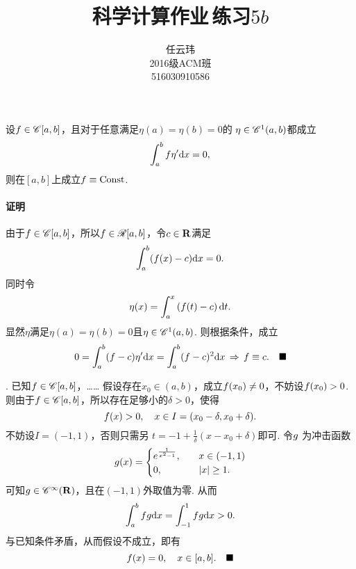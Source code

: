 

\title{科学计算作业$\,$练习$5b$}
\author{\small 任云玮\\\small2016级ACM班\\\small516030910586}
\date{}


\maketitle

\begin{lemma}
  \label{lemma: 变分引理2}
  设$\mathnormal{f}\in\mathscr{C}[a, b]$，且对于任意满足$\eta(a) = \eta(b) = 0$的
  $\eta\in\mathscr{C}^1(a, b)$都成立
  \[
    \int_a^b\mathnormal{f}\eta^{\prime}\mathrm{d} x = 0,
  \]
  则在$[a, b]$上成立$\mathnormal{f}\equiv \text{Const}$.
\end{lemma}
\paragraph{证明}
  由于$\mathnormal{f}\in\mathscr{C}[a, b]$，所以$\mathnormal{f}\in\mathscr{R}[a, b]$，令$c\in\mathbf{R}$满足
  \[
    \int_a^b (\mathnormal{f}(x)-c) \mathrm{d} x = 0.
  \]
  同时令
  \[
    \eta(x) = \int_a^x \left( \mathnormal{f}(t)-c \right)\mathrm{d} t.
  \]
  显然$\eta$满足$\eta(a) = \eta(b) = 0$且$\eta\in\mathscr{C}^1(a, b)$.
  则根据条件，成立
  \[
    0 = \int_a^b(\mathnormal{f}-c)\eta^{\prime}\mathrm{d} x = \int_a^b(\mathnormal{f}-c)^2\mathrm{d} x
    \,\Rightarrow\,
    \mathnormal{f} \equiv c.\quad\blacksquare
  \]


\vspace{2cm}
. 已知$\mathnormal{f}\in\mathscr{C}[a, b]$，……
\proof
  假设存在$x_0\in(a, b)$，成立$\mathnormal{f}(x_0)\ne0$，不妨设$\mathnormal{f}(x_0)>0$.
  则由于$\mathnormal{f}\in\mathscr{C}[a, b]$，所以存在足够小的$\delta>0$，使得
  \[
    \mathnormal{f}(x) > 0,\quad x\in I = (x_0-\delta, x_0+\delta).
  \]
  不妨设$I = (-1, 1)$，否则只需另
  $t = -1 + \frac{1}{\delta}(x-x_0+\delta)$即可. 令$\mathnormal{g}$
  为冲击函数
  \[
    \mathnormal{g}(x) =
    \begin{cases}
      e^{\frac{1}{x^2-1}},\quad &x\in(-1, 1) \\
      0,                         & |x|\ge 1.
    \end{cases}
  \]
  可知$\mathnormal{g}\in\mathscr{C}^\infty(\mathbf{R})$，且在$(-1, 1)$外取值为零. 从而
  \[
    \int_a^b\mathnormal{f}\mathnormal{g}\mathrm{d} x = \int_{-1}^{1}\mathnormal{f}\mathnormal{g}\mathrm{d} x > 0.
  \]
  与已知条件矛盾，从而假设不成立，即有
  \[
    \mathnormal{f}(x) = 0, \quad x\in[a, b].\quad\blacksquare
  \]

